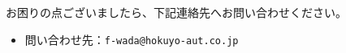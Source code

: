
お困りの点ございましたら、下記連絡先へお問い合わせください。

\begin{itemize}
  \item 問い合わせ先：\verb|f-wada@hokuyo-aut.co.jp|
\end{itemize}

